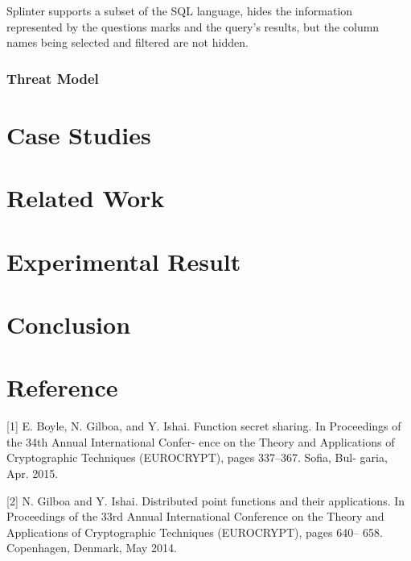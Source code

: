 \documentclass[12pt,a4paper]{article}
\begin{document}
\begin{multicols}{2}
Splinter supports a subset of the SQL language, 
hides the information represented by the questions 
marks and the query’s results, but the column names 
being selected and filtered are not hidden.
\subsubsection{Threat Model}

\section{Case Studies}
\section{Related Work}
\section{Experimental Result}
\section{Conclusion}

\section{Reference}
[1] E. Boyle, N. Gilboa, and Y. Ishai. Function 
secret sharing. In Proceedings of the 34th Annual 
International Confer- ence on the Theory and 
Applications of Cryptographic Techniques 
(EUROCRYPT), pages 337–367. Sofia, Bul- garia, Apr. 
2015.

[2] N. Gilboa and Y. Ishai. Distributed point 
functions and their applications. In Proceedings of 
the 33rd Annual International Conference on the 
Theory and Applications of Cryptographic Techniques 
(EUROCRYPT), pages 640– 658. Copenhagen, Denmark, 
May 2014.



\end{multicols}
\end{document}
